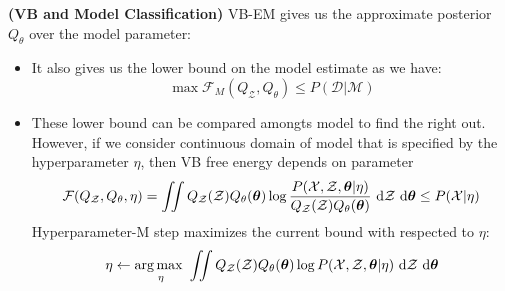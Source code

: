 \begin{remark}{\textbf{(VB and Model Classification)}}
    VB-EM gives us the approximate posterior $Q_\theta$ over the model parameter:
    \begin{itemize}
        \item It also gives us the lower bound on the model estimate as we have:
        \begin{equation*}
            \max\mathcal{F}_M(Q_\mathcal{Z}, Q_\theta) \le P(\mathcal{D}|\mathcal{M})
        \end{equation*}
        \item These lower bound can be compared amongts model to find the right out. However, if we consider continuous domain of model that is specified by the hyperparameter $\eta$, then VB free energy depends on parameter
        \begin{equation*}
            \mathcal{F}(Q_\mathcal{Z}, Q_\theta,\eta) = \iint Q_\mathcal{Z}(\mathcal{Z})Q_\theta(\boldsymbol \theta) \log \frac{P(\mathcal{X}, \mathcal{Z}, \boldsymbol \theta | \eta)}{Q_\mathcal{Z}(\mathcal{Z})Q_\theta(\boldsymbol \theta)}  \ \mathrm{d} \mathcal{Z}\ \mathrm{d}\boldsymbol \theta \le P(\mathcal{X}|\eta)
        \end{equation*}
        Hyperparameter-M step maximizes the current bound with respected to $\eta$:
        \begin{equation*}
            \eta \leftarrow \underset{\eta}{\arg\max \ } \iint Q_\mathcal{Z}(\mathcal{Z})Q_\theta(\boldsymbol \theta) \log P(\mathcal{X}, \mathcal{Z}, \boldsymbol \theta | \eta) \ \mathrm{d} \mathcal{Z}\ \mathrm{d}\boldsymbol \theta
        \end{equation*}
    \end{itemize}
\end{remark}


